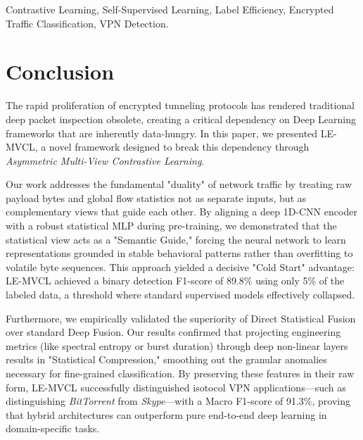 \documentclass[lettersize,journal]{IEEEtran}
\begin{document}
\begin{IEEEkeywords}
Contrastive Learning, Self-Supervised Learning, Label Efficiency, Encrypted Traffic Classification, VPN Detection.
\end{IEEEkeywords}








\section{Conclusion}
The rapid proliferation of encrypted tunneling protocols has rendered traditional deep packet inspection obsolete, creating a critical dependency on Deep Learning frameworks that are inherently data-hungry. In this paper, we presented LE-MVCL, a novel framework designed to break this dependency through \textit{Asymmetric Multi-View Contrastive Learning}.

Our work addresses the fundamental "duality" of network traffic by treating raw payload bytes and global flow statistics not as separate inputs, but as complementary views that guide each other. By aligning a deep 1D-CNN encoder with a robust statistical MLP during pre-training, we demonstrated that the statistical view acts as a "Semantic Guide," forcing the neural network to learn representations grounded in stable behavioral patterns rather than overfitting to volatile byte sequences. This approach yielded a decisive "Cold Start" advantage: LE-MVCL achieved a binary detection F1-score of 89.8\% using only 5\% of the labeled data, a threshold where standard supervised models effectively collapsed.

Furthermore, we empirically validated the superiority of Direct Statistical Fusion over standard Deep Fusion. Our results confirmed that projecting engineering metrics (like spectral entropy or burst duration) through deep non-linear layers results in "Statistical Compression," smoothing out the granular anomalies necessary for fine-grained classification. By preserving these features in their raw form, LE-MVCL successfully distinguished isotocol VPN applications—such as distinguishing \textit{BitTorrent} from \textit{Skype}—with a Macro F1-score of 91.3\%, proving that hybrid architectures can outperform pure end-to-end deep learning in domain-specific tasks.
\end{document}
